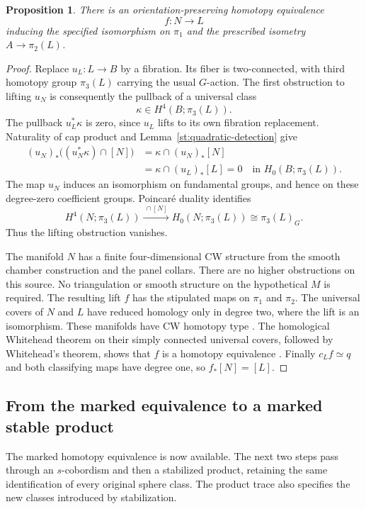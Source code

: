 \documentclass[11pt]{article}
\newtheorem{proposition}[theorem]{Proposition}
\theoremstyle{definition}
\theoremstyle{remark}
\begin{document}
\begin{proposition}\label{st:marked-equivalence}
There is an orientation-preserving homotopy equivalence
\[
 f\colon N\longrightarrow L
\]
inducing the specified isomorphism on $\pi_1$ and the prescribed
isometry $A\to\pi_2(L)$.
\end{proposition}

\begin{proof}
Replace $u_L\colon L\to B$ by a fibration.  Its fiber is
two-connected, with third homotopy group $\pi_3(L)$ carrying the
usual $G$-action.  The first obstruction to lifting $u_N$ is consequently
the pullback of a universal class
\[
 \kappa\in H^4(B;\pi_3(L)).
\]
The pullback $u_L^*\kappa$ is zero, since $u_L$ lifts to its own
fibration replacement.  Naturality of cap product and
Lemma~\ref{st:quadratic-detection} give
\begin{align*}
 (u_N)_*\bigl((u_N^*\kappa)\mathbin{\cap}[N]\bigr)
 &=\kappa\mathbin{\cap}(u_N)_*[N]\\
 &=\kappa\mathbin{\cap}(u_L)_*[L]=0
 \quad\text{in }H_0(B;\pi_3(L)).
\end{align*}
The map $u_N$ induces an isomorphism on fundamental groups, and hence
on these degree-zero coefficient groups.  Poincar\'e duality identifies
\[
 H^4(N;\pi_3(L))\xrightarrow{\ \cap[N]\ }
 H_0(N;\pi_3(L))\cong\pi_3(L)_G.
\]
Thus the lifting obstruction vanishes.

The manifold $N$ has a finite four-dimensional CW structure from the
smooth chamber construction and the panel collars.  There are no
higher obstructions on this source.  No triangulation or smooth
structure on the hypothetical $M$ is required.  The resulting lift
$f$ has the stipulated maps on $\pi_1$ and $\pi_2$.  The universal
covers of $N$ and $L$ have reduced homology only in degree two, where
the lift is an isomorphism. These manifolds have CW homotopy type
\cite[Corollary~1]{MilnorCW}. The homological Whitehead theorem on their
simply connected universal covers, followed by Whitehead's theorem,
shows that $f$ is a homotopy equivalence
\cite[Corollary~4.33 and Theorem~4.5]{Hatcher}.
Finally $c_Lf\simeq q$ and both classifying maps have degree one, so
$f_*[N]=[L]$.
\end{proof}

\subsection{From the marked equivalence to a marked stable product}

The marked homotopy equivalence is now available. The next two steps
pass through an $s$-cobordism and then a stabilized product, retaining
the same identification of every original sphere class. The product
trace also specifies the new classes introduced by stabilization.
\end{document}
